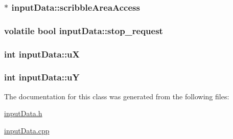 \label{classinputData_a037542f6902942f602c2c39a96933646}
\hypertarget{classinputData_a2a1bd4615bbf788f18e9352cc1b15b8b}{
\subsubsection[{scribbleAreaAccess}]{$\ast$ {\bf inputData::scribbleAreaAccess}}}
\label{classinputData_a2a1bd4615bbf788f18e9352cc1b15b8b}
\hypertarget{classinputData_aa241df26fe2f43448724bb801af61a07}{
\subsubsection[{stop\_\-request}]{\setlength{\rightskip}{0pt plus 5cm}volatile bool {\bf inputData::stop\_\-request}}}
\label{classinputData_aa241df26fe2f43448724bb801af61a07}
\hypertarget{classinputData_a2e8223509680d8fffb007c2c5abe880d}{
\subsubsection[{uX}]{\setlength{\rightskip}{0pt plus 5cm}int {\bf inputData::uX}}}
\label{classinputData_a2e8223509680d8fffb007c2c5abe880d}
\hypertarget{classinputData_af4ee5ed0f3f38f39d96d3627373c6040}{
\subsubsection[{uY}]{\setlength{\rightskip}{0pt plus 5cm}int {\bf inputData::uY}}}
\label{classinputData_af4ee5ed0f3f38f39d96d3627373c6040}


The documentation for this class was generated from the following files:\begin{DoxyCompactItemize}
\item 
\hyperlink{inputData_8h}{inputData.h}\item 
\hyperlink{inputData_8cpp}{inputData.cpp}\end{DoxyCompactItemize}
